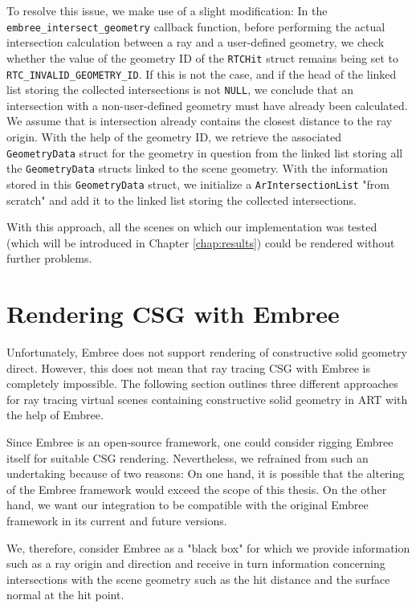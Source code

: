 To resolve this issue, we make use of a slight modification: In the  \texttt{embree\_intersect\_geometry} callback function, before performing the actual intersection calculation between a ray and a user-defined geometry, we check whether the value of the geometry ID of the \texttt{RTCHit} struct remains being set to \texttt{RTC\_INVALID\_GEOMETRY\_ID}. If this is not the case, and if the head of the linked list storing the collected intersections is not \texttt{NULL}, we conclude that an intersection with a non-user-defined geometry must have already been calculated. We assume that is intersection already contains the closest distance to the ray origin. With the help of the geometry ID, we retrieve the associated \texttt{GeometryData} struct for the geometry in question from the linked list storing all the \texttt{GeometryData} structs linked to the scene geometry. With the information stored in this \texttt{GeometryData} struct, we initialize a \texttt{ArIntersectionList} "from scratch" and add it to the linked list storing the collected intersections.

With this approach, all the scenes on which our implementation was tested (which will be introduced in Chapter \ref{chap:results}) could be rendered without further problems.


\section{Rendering CSG with Embree}
\label{sec:embree_csg}

Unfortunately, Embree does not support rendering of constructive solid geometry direct. However, this does not mean that ray tracing CSG with Embree is completely impossible. The following section outlines three different approaches for ray tracing virtual scenes containing constructive solid geometry in ART with the help of Embree.

Since Embree is an open-source framework, one could consider rigging Embree itself for suitable CSG rendering. Nevertheless, we refrained from such an undertaking because of two reasons: On one hand, it is possible that the altering of the Embree framework would exceed the scope of this thesis. On the other hand, we want our integration to be compatible with the original Embree framework in its current and future versions.

We, therefore, consider Embree as a "black box" for which we provide information such as a ray origin and direction and receive in turn information concerning intersections with the scene geometry such as the hit distance and the surface normal at the hit point.


